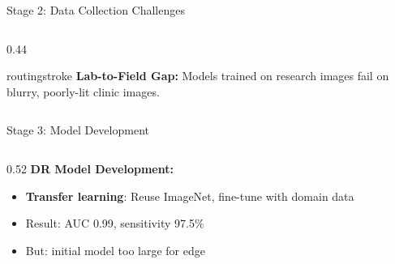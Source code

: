 \documentclass[aspectratio=169, 12pt]{beamer}
\begin{document}
\begin{frame}{Stage 2: Data Collection Challenges}
\begin{columns}[T]
\begin{column}{0.44\textwidth}
    \vspace{0.1cm}
    \begin{mlsyscard}{routingstroke}
    {\scriptsize \textbf{Lab-to-Field Gap:} Models trained on research images fail on blurry, poorly-lit clinic images.}
    \end{mlsyscard}
  \end{column}
\end{columns}

\end{frame}

\begin{frame}{Stage 3: Model Development}
\note{
%
%
%
%
}

\footnotesize
\begin{columns}[T]
  \begin{column}{0.52\textwidth}
    \textbf{DR Model Development:}
    \begin{itemize}\setlength\itemsep{0pt}
      \item \textbf{Transfer learning}: Reuse ImageNet, fine-tune with domain data
      \item Result: AUC 0.99, sensitivity 97.5\%
      \item But: initial model too large for edge
    \end{itemize}


\end{column}
\end{columns}
\end{frame}
\end{document}
